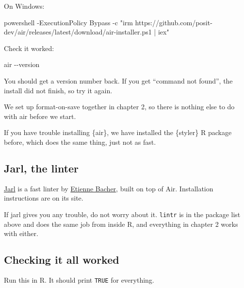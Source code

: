 \documentclass[
  letterpaper,
  justified,
  a4paper]{tufte-book}
\makeatletter
\newenvironment{Shaded}{\begin{snugshade}}{\end{snugshade}}
\newcommand{\AttributeTok}[1]{\textcolor[rgb]{0.40,0.45,0.13}{#1}}
\newcommand{\ExtensionTok}[1]{\textcolor[rgb]{0.00,0.23,0.31}{#1}}
\newcommand{\NormalTok}[1]{\textcolor[rgb]{0.00,0.23,0.31}{#1}}
\newcommand{\OperatorTok}[1]{\textcolor[rgb]{0.37,0.37,0.37}{#1}}
\newcommand{\StringTok}[1]{\textcolor[rgb]{0.13,0.47,0.30}{#1}}
\let\rbporigShaded\Shaded
\let\rbporigendShaded\endShaded
\renewenvironment{Shaded}{%
  \begingroup
  \ifdim\linewidth=\rbpbodywidth
    \advance\linewidth by \@tufte@overhang
    \advance\hsize by \@tufte@overhang
    \advance\columnwidth by \@tufte@overhang
  \fi
  \rbporigShaded
}{%
  \rbporigendShaded
  \endgroup
}
\makeatother
\begin{document}
On Windows:

\begin{Shaded}
\begin{Highlighting}[]
\NormalTok{powershell }\OperatorTok{{-}}\NormalTok{ExecutionPolicy Bypass }\OperatorTok{{-}}\NormalTok{c }\StringTok{"irm https://github.com/posit{-}dev/air/releases/latest/download/air{-}installer.ps1 | iex"}
\end{Highlighting}
\end{Shaded}

Check it worked:

\begin{Shaded}
\begin{Highlighting}[]
\ExtensionTok{air} \AttributeTok{{-}{-}version}
\end{Highlighting}
\end{Shaded}

You should get a version number back. If you get ``command not found'',
the install did not finish, so try it again.

We set up format-on-save together in chapter 2, so there is nothing else
to do with air before we start.

If you have trouble installing \{air\}, we have installed the \{styler\}
R package before, which does the same thing, just not as fast.

\subsection*{Jarl, the linter}\label{jarl-the-linter}

\href{https://jarl.etiennebacher.com/}{Jarl} is a fast linter by
\href{https://www.etiennebacher.com/}{Etienne Bacher}, built on top of
Air. Installation instructions are on its site.

If jarl gives you any trouble, do not worry about it. \texttt{lintr} is
in the package list above and does the same job from inside R, and
everything in chapter 2 works with either.

\subsection*{Checking it all worked}\label{checking-it-all-worked}

Run this in R. It should print \texttt{TRUE} for everything.
\end{document}
